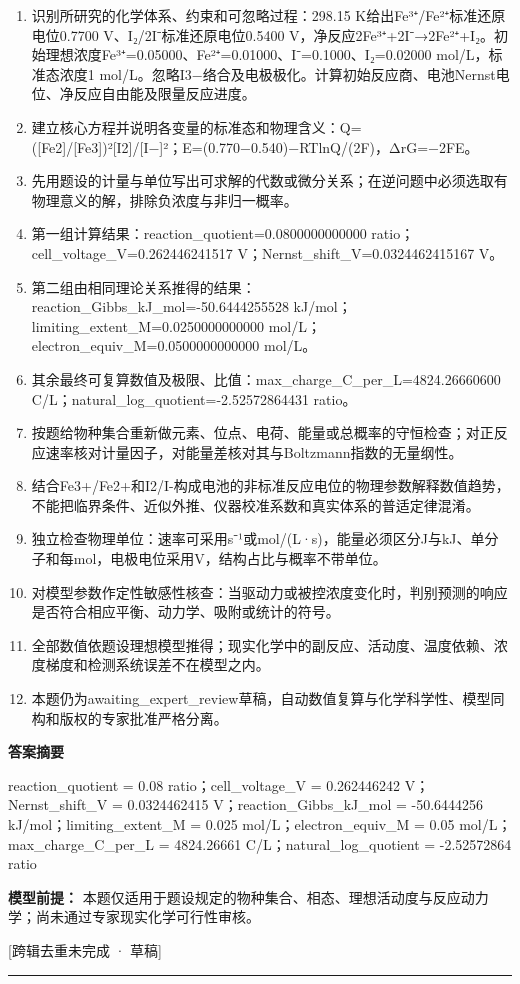 \documentclass[UTF8,11pt,a4paper]{ctexart}
\begin{document}
\begin{enumerate}
\item 识别所研究的化学体系、约束和可忽略过程：298.15 K给出Fe³⁺/Fe²⁺标准还原电位0.7700 V、I₂/2I⁻标准还原电位0.5400 V，净反应2Fe³⁺+2I⁻→2Fe²⁺+I₂。初始理想浓度Fe³⁺=0.05000、Fe²⁺=0.01000、I⁻=0.1000、I₂=0.02000 mol/L，标准态浓度1 mol/L。忽略I3−络合及电极极化。计算初始反应商、电池Nernst电位、净反应自由能及限量反应进度。
\item 建立核心方程并说明各变量的标准态和物理含义：Q=([Fe2]/[Fe3])²[I2]/[I−]²；E=(0.770−0.540)−RTlnQ/(2F)，ΔrG=−2FE。
\item 先用题设的计量与单位写出可求解的代数或微分关系；在逆问题中必须选取有物理意义的解，排除负浓度与非归一概率。
\item 第一组计算结果：reaction\_quotient=0.0800000000000 ratio；cell\_voltage\_V=0.262446241517 V；Nernst\_shift\_V=0.0324462415167 V。
\item 第二组由相同理论关系推得的结果：reaction\_Gibbs\_kJ\_mol=-50.6444255528 kJ/mol；limiting\_extent\_M=0.0250000000000 mol/L；electron\_equiv\_M=0.0500000000000 mol/L。
\item 其余最终可复算数值及极限、比值：max\_charge\_C\_per\_L=4824.26660600 C/L；natural\_log\_quotient=-2.52572864431 ratio。
\item 按题给物种集合重新做元素、位点、电荷、能量或总概率的守恒检查；对正反应速率核对计量因子，对能量差核对其与Boltzmann指数的无量纲性。
\item 结合Fe3+/Fe2+和I2/I-构成电池的非标准反应电位的物理参数解释数值趋势，不能把临界条件、近似外推、仪器校准系数和真实体系的普适定律混淆。
\item 独立检查物理单位：速率可采用s⁻¹或mol/(L·s)，能量必须区分J与kJ、单分子和每mol，电极电位采用V，结构占比与概率不带单位。
\item 对模型参数作定性敏感性核查：当驱动力或被控浓度变化时，判别预测的响应是否符合相应平衡、动力学、吸附或统计的符号。
\item 全部数值依题设理想模型推得；现实化学中的副反应、活动度、温度依赖、浓度梯度和检测系统误差不在模型之内。
\item 本题仍为awaiting\_expert\_review草稿，自动数值复算与化学科学性、模型同构和版权的专家批准严格分离。
\end{enumerate}
\noindent\textbf{答案摘要}\par
reaction\_quotient = 0.08 ratio；cell\_voltage\_V = 0.262446242 V；Nernst\_shift\_V = 0.0324462415 V；reaction\_Gibbs\_kJ\_mol = -50.6444256 kJ/mol；limiting\_extent\_M = 0.025 mol/L；electron\_equiv\_M = 0.05 mol/L；max\_charge\_C\_per\_L = 4824.26661 C/L；natural\_log\_quotient = -2.52572864 ratio\par
\noindent\textbf{模型前提：}
本题仅适用于题设规定的物种集合、相态、理想活动度与反应动力学；尚未通过专家现实化学可行性审核。\par
\noindent\textcolor{red!65!black}{[跨辑去重未完成 · 草稿]} \par
\medskip\hrule\medskip
{}
\end{document}
